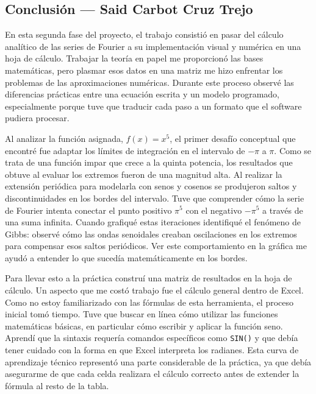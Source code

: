 \subsection{Conclusión — Said Carbot Cruz Trejo}
\label{sec:cap02:concl:said}

En esta segunda fase del proyecto, el trabajo consistió en pasar del cálculo analítico de las series de Fourier a su implementación visual y numérica en una hoja de cálculo. Trabajar la teoría en papel me proporcionó las bases matemáticas, pero plasmar esos datos en una matriz me hizo enfrentar los problemas de las aproximaciones numéricas. Durante este proceso observé las diferencias prácticas entre una ecuación escrita y un modelo programado, especialmente porque tuve que traducir cada paso a un formato que el software pudiera procesar.

Al analizar la función asignada, $f(x)=x^5$, el primer desafío conceptual que encontré fue adaptar los límites de integración en el intervalo de $-\pi$ a $\pi$. Como se trata de una función impar que crece a la quinta potencia, los resultados que obtuve al evaluar los extremos fueron de una magnitud alta. Al realizar la extensión periódica para modelarla con senos y cosenos se produjeron saltos y discontinuidades en los bordes del intervalo. Tuve que comprender cómo la serie de Fourier intenta conectar el punto positivo $\pi^5$ con el negativo $-\pi^5$ a través de una suma infinita. Cuando grafiqué estas iteraciones identifiqué el fenómeno de Gibbs: observé cómo las ondas senoidales creaban oscilaciones en los extremos para compensar esos saltos periódicos. Ver este comportamiento en la gráfica me ayudó a entender lo que sucedía matemáticamente en los bordes.

Para llevar esto a la práctica construí una matriz de resultados en la hoja de cálculo. Un aspecto que me costó trabajo fue el cálculo general dentro de Excel. Como no estoy familiarizado con las fórmulas de esta herramienta, el proceso inicial tomó tiempo. Tuve que buscar en línea cómo utilizar las funciones matemáticas básicas, en particular cómo escribir y aplicar la función seno. Aprendí que la sintaxis requería comandos específicos como \texttt{SIN()} y que debía tener cuidado con la forma en que Excel interpreta los radianes. Esta curva de aprendizaje técnico representó una parte considerable de la práctica, ya que debía asegurarme de que cada celda realizara el cálculo correcto antes de extender la fórmula al resto de la tabla.

